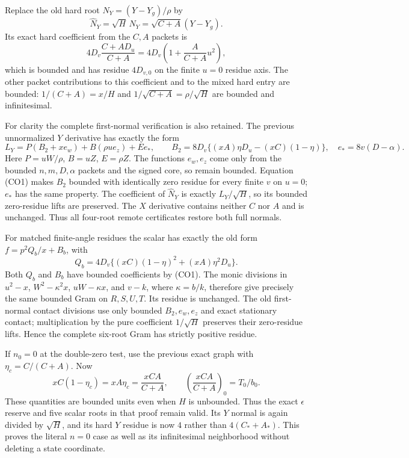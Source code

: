 Replace the old hard root $N_Y=(Y-Y_g)/\rho$ by
\[
        \widehat N_Y=\sqrt H\,N_Y=\sqrt{C+A}(Y-Y_g).
                                                               \tag{CO3}
\]
Its exact hard coefficient from the $C,A$ packets is
\[
             4D_v\frac{C+AD_u}{C+A}
       =4D_v\left(1+\frac{A}{C+A}u^2\right),             \tag{CO4}
\]
which is bounded and has residue $4D_{v,0}$ on the finite $u=0$
residue axis.  The other packet contributions to this coefficient
and to the mixed hard entry are bounded: $1/(C+A)=x/H$ and
$1/\sqrt{C+A}=\rho/\sqrt H$ are bounded and infinitesimal.

For clarity the complete first-normal verification is also retained.
The previous unnormalized $Y$ derivative has exactly the form
\[
 L_Y=P(B_2+xe_w)+B(\rho u e_z)+E e_*,\qquad
 B_2=8D_v\{(xA)\eta D_u-(xC)(1-\eta)\},
 \quad e_*=8v(D-\alpha).                                \tag{CO5}
\]
Here $P=uW/\rho$, $B=uZ$, $E=\rho Z$.  The functions $e_w,e_z$
come only from the bounded $n,m,D,\alpha$ packets and the signed
core, so remain bounded.  Equation (CO1) makes $B_2$ bounded with
identically zero residue for every finite $v$ on $u=0$; $e_*$ has
the same property.  The coefficient of $\widehat N_Y$ is exactly
$L_Y/\sqrt H$, so its bounded zero-residue lifts are preserved.
The $X$ derivative contains neither $C$ nor $A$ and is unchanged.
Thus all four-root remote certificates restore both full normals.

For matched finite-angle residues the scalar has exactly the old
form $f=p^2Q_b/x+B_b$, with
\[
 Q_b=4D_v\{(xC)(1-\eta)^2+(xA)\eta^2D_u\}.
\]
Both $Q_b$ and $B_b$ have bounded coefficients by (CO1).  The monic
divisions in $u^2-x$, $W^2-\kappa^2x$, $uW-\kappa x$, and $v-k$,
where $\kappa=b/k$, therefore give precisely the same bounded Gram
on $R,S,U,T$.  Its residue is unchanged.  The old first-normal
contact divisions use only bounded $B_2,e_w,e_z$ and exact stationary
contact; multiplication by the pure coefficient $1/\sqrt H$
preserves their zero-residue lifts.  Hence the complete six-root
Gram has strictly positive residue.

If $n_0=0$ at the double-zero test, use the previous exact graph
with $\eta_c=C/(C+A)$.  Now
\[
 xC(1-\eta_c)=xA\eta_c=\frac{xCA}{C+A},
 \qquad
 \left(\frac{xCA}{C+A}\right)_0=T_0/b_0.                \tag{CO6}
\]
These quantities are bounded units even when $H$ is unbounded.
Thus the exact $\epsilon$ reserve and five scalar roots in that
proof remain valid.  Its $Y$ normal is again divided by $\sqrt H$,
and its hard $Y$ residue is now $4$ rather than $4(C_*+A_*)$.
This proves the literal $n=0$ case as well as its infinitesimal
neighborhood without deleting a state coordinate.

